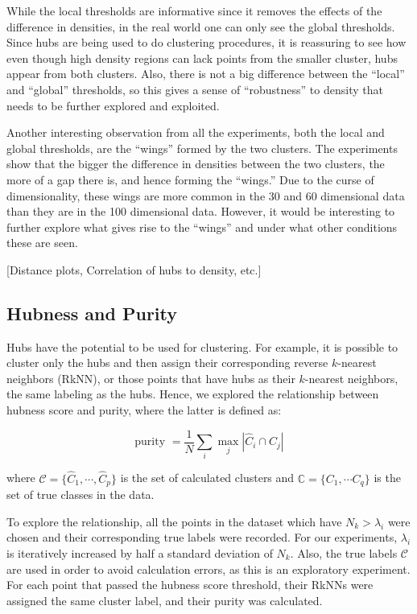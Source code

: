 \documentclass[graybox]{svmult}
\begin{document}
While the local thresholds are informative since it removes the effects of the difference in densities, in the real world one can only see the global thresholds. Since hubs are being used to do clustering procedures, it is reassuring to see how even though high density regions can lack points from the smaller cluster, hubs appear from both clusters. Also, there is not a big difference between the ``local'' and ``global'' thresholds, so this gives a sense of ``robustness'' to density that needs to be further explored and exploited.

Another interesting observation from all the experiments, both the local and global thresholds, are the ``wings'' formed by the two clusters. The experiments show that the bigger the difference in densities between the two clusters, the more of a gap there is, and hence forming the ``wings.'' Due to the curse of dimensionality, these wings are more common in the 30 and 60 dimensional data than they are in the 100 dimensional data. However, it would be interesting to further explore what gives rise to the ``wings'' and under what other conditions these are seen.

[Distance plots, Correlation of hubs to density, etc.]

\subsection{Hubness and Purity}
\label{purityHubness}

Hubs have the potential to be used for clustering. For example, it is possible to cluster only the hubs and then assign their corresponding reverse $k$-nearest neighbors (RkNN), or those points that have hubs as their $k$-nearest neighbors, the same labeling as the hubs. Hence, we explored the relationship between hubness score and purity, where the latter is defined as:

\[
\mbox{purity } = \frac{1}{N} \sum_i \max_j |\hat{C}_i \cap C_j|
\]

where $\mathcal{C} = \{\hat{C}_1,\cdots,\hat{C}_p\}$ is the set of calculated clusters and $\mathbb{C} = \{C_1,\cdots C_q\}$ is the set of true classes in the data.

To explore the relationship, all the points in the dataset which have $N_k > \lambda_i$ were chosen and their corresponding true labels were recorded. For our experiments, $\lambda_i$ is iteratively increased by half a standard deviation of $N_k$. Also, the true labels $\mathcal{C}$ are used in order to avoid calculation errors, as this is an exploratory experiment. For each point that passed the hubness score threshold, their RkNNs were assigned the same cluster label, and their purity was calculated.
\end{document}
